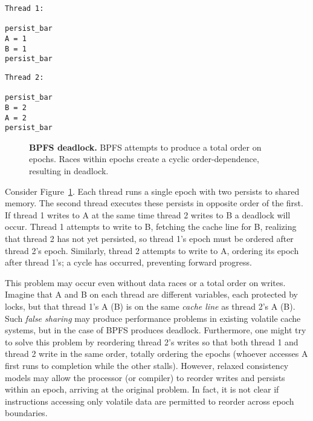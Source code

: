 {
\singlespacing
\newsavebox{\ThreadOne}
\begin{lrbox}{\ThreadOne}
  \begin{lstlisting}
Thread 1:

persist_bar
A = 1
B = 1
persist_bar
  \end{lstlisting}
\end{lrbox}

\newsavebox{\ThreadTwo}
\begin{lrbox}{\ThreadTwo}
  \begin{lstlisting}
Thread 2:

persist_bar
B = 2
A = 2
persist_bar
  \end{lstlisting}
\end{lrbox}

\begin{figure}[]
\centering
\subfigure{ \usebox{\ThreadOne} }
\hspace{1 in}
\subfigure{ \usebox{\ThreadTwo} }
\caption{\textbf{BPFS deadlock.} BPFS attempts to produce a total order on epochs.  Races within epochs create a cyclic order-dependence, resulting in deadlock.}
\label{fig:BPFS_deadlock}
\end{figure}
}

Consider Figure~\ref{fig:BPFS_deadlock}.
Each thread runs a single epoch with two persists to shared memory.
The second thread executes these persists in opposite order of the first.
If thread 1 writes to A at the same time thread 2 writes to B a deadlock will occur.
Thread 1 attempts to write to B, fetching the cache line for B, realizing that thread 2 has not yet persisted, so thread 1's epoch must be ordered after thread 2's epoch.
Similarly, thread 2 attempts to write to A, ordering its epoch after thread 1's; a cycle has occurred, preventing forward progress.

This problem may occur even without data races or a total order on writes.
Imagine that A and B on each thread are different variables, each protected by locks, but that thread 1's A (B) is on the same \emph{cache line} as thread 2's A (B).
Such \emph{false sharing} may produce performance problems in existing volatile cache systems, but in the case of BPFS produces deadlock.
Furthermore, one might try to solve this problem by reordering thread 2's writes so that both thread 1 and thread 2 write in the same order, totally ordering the epochs (whoever accesses A first runs to completion while the other stalls).
However, relaxed consistency models may allow the processor (or compiler) to reorder writes and persists within an epoch, arriving at the original problem.
In fact, it is not clear if instructions accessing only volatile data are permitted to reorder across epoch boundaries.

